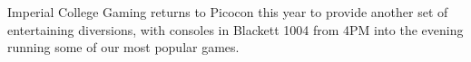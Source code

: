 Imperial College Gaming returns to Picocon this year to provide
another set of entertaining diversions, with consoles in Blackett 1004
from 4PM into the evening running some of our most popular games.
